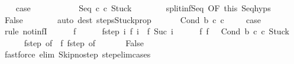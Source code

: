 \begin{isabellebody}
\ \ \isamarkupfalse%
\ {\isacharquery}case\isanewline
\ \ \isamarkupfalse%
\ \isanewline
\ \ \ \ \isamarkupfalse%
\ {\isachardoublequoteopen}{\isasymGamma}{\isasymturnstile}\ {\isacharparenleft}Seq\ c\ c\ Stuck{\isacharparenright}\ {\isasymrightarrow}\ {\isasymdots}{\isacharparenleft}{\isasyminfinity}{\isacharparenright}{\isachardoublequoteclose}\isanewline
\ \ \ \ \isamarkupfalse%
\ split{\isacharunderscore}inf{\isacharunderscore}Seq\ {\isacharbrackleft}OF\ this{\isacharbrackright}\ Seq{\isachardot}hyps\isanewline
\ \ \ \ \isamarkupfalse%
\ False\isanewline
\ \ \ \ \ \ \isamarkupfalse%
\ {\isacharparenleft}auto\ dest{\isacharcolon}\ steps{\isacharunderscore}Stuck{\isacharunderscore}prop{\isacharparenright}\isanewline
\ \ \isamarkupfalse%
\isanewline
{}\isamarkupfalse%
\isanewline
\ \ \isamarkupfalse%
\ {\isacharparenleft}Cond\ b\ c\ c\ \isanewline
\ \ \isamarkupfalse%
\ {\isacharquery}case\ \isanewline
\ \ \isamarkupfalse%
\ {\isacharparenleft}rule\ not{\isacharunderscore}infI{\isacharparenright}\isanewline
\ \ \ \ \isamarkupfalse%
\ f\isanewline
\ \ \ \ \isamarkupfalse%
\ f{\isacharunderscore}step{\isacharcolon}\ {\isachardoublequoteopen}{\isasymAnd}i{\isachardot}\ {\isasymGamma}{\isasymturnstile}f\ i\ {\isasymrightarrow}\ f\ {\isacharparenleft}Suc\ i{\isacharparenright}{\isachardoublequoteclose}\isanewline
\ \ \ \ \isamarkupfalse%
\ f{\isacharunderscore}{}{\isacharcolon}\ {\isachardoublequoteopen}f\ {}\ {\isacharequal}\ {\isacharparenleft}Cond\ b\ c\ c\ Stuck{\isacharparenright}{\isachardoublequoteclose}\ \isanewline
\ \ \ \ \isamarkupfalse%
\ f{\isacharunderscore}step\ {\isacharbrackleft}of\ {}{\isacharbrackright}\ f{\isacharunderscore}{}\ f{\isacharunderscore}step\ {\isacharbrackleft}of\ {}{\isacharbrackright}\isanewline
\ \ \ \ \isamarkupfalse%
\ False\isanewline
\ \ \ \ \ \ \isamarkupfalse%
\ {\isacharparenleft}fastforce\ elim{\isacharcolon}\ Skip{\isacharunderscore}no{\isacharunderscore}step\ step{\isacharunderscore}elim{\isacharunderscore}cases{\isacharparenright}\isanewline
\ \ \isamarkupfalse%

\end{isabellebody}
